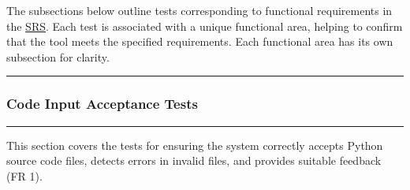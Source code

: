 \documentclass[12pt, titlepage]{article}
\newcommand{\SRS}{\href{https://github.com/ssm-lab/capstone--source-code-optimizer/blob/main/docs/SRS/SRS.pdf}{SRS}}
\newcommand{\colorrule}{\textcolor{BlueViolet}{\rule{\linewidth}{2pt}}}
\begin{document}
The subsections below outline tests corresponding to functional 
requirements in the \SRS \cite{SRS}. Each test is associated with a unique functional area, helping to confirm that the tool meets the specified requirements. Each functional area has its own subsection for clarity.

\noindent
\colorrule

\subsubsection{Code Input Acceptance Tests}
\colorrule

\medskip

\noindent
This section covers the tests for ensuring the system correctly accepts Python source code files, detects errors in invalid files, and provides suitable feedback (FR 1).
\end{document}
